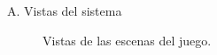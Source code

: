 \begin{annexes}{A. Vistas del sistema}
\begin{figure}[!ht]
        \caption{Vistas de las escenas del juego.}
        \label{annex: 6}
    \end{figure}

\end{annexes}

